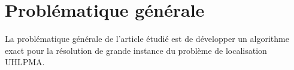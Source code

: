 \section{Problématique générale}

La problématique générale de l'article étudié est de développer un algorithme exact pour la résolution de grande instance du problème de localisation UHLPMA.




